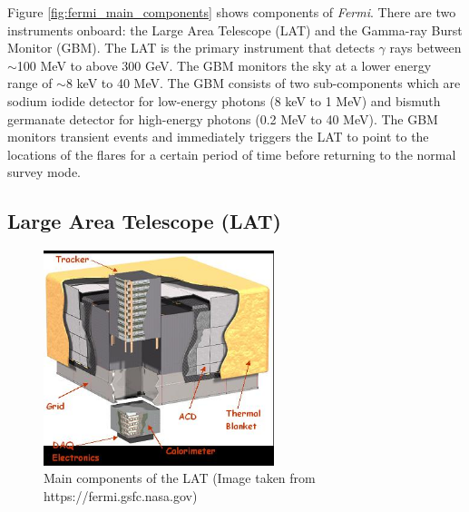 Figure \ref{fig:fermi_main_components} shows
components of \textit{Fermi}.
There are two instruments onboard: the Large Area Telescope (LAT)
and the Gamma-ray Burst Monitor (GBM).
The LAT is the primary instrument that detects $\gamma$ rays
between $\sim$100 MeV to above 300 GeV. The GBM monitors the sky at
a lower energy range of $\sim$8 keV to 40 MeV.
The GBM consists of two 
sub-components which are sodium iodide detector for low-energy photons
(8 keV to 1 MeV) and bismuth germanate detector for high-energy photons 
(0.2 MeV to 40 MeV).
The GBM monitors transient events and immediately triggers the
LAT to point to the locations of the flares for a certain period
of time before returning to the normal survey mode.

\subsection{Large Area Telescope (LAT)}


\begin{figure}[h!]
    \centering
    \includegraphics[width=0.6\textwidth]{content/background/figures/LATStructure.jpg}
    \caption{Main components of the LAT (Image taken from https://fermi.gsfc.nasa.gov)}
    \label{fig:fermi_lat_structure}
\end{figure}

